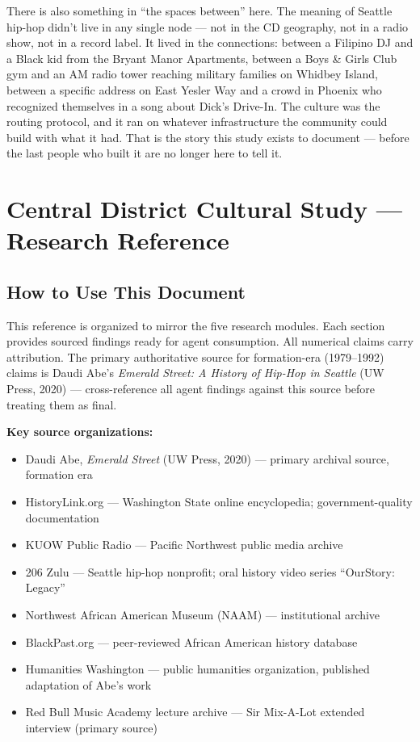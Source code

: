 \documentclass[11pt,letterpaper]{article}
\newcommand{\stageheader}[2]{%
  \noindent\colorbox{#2}{\makebox[\textwidth][l]{%
    \textcolor{white}{\bfseries\sffamily\hspace{6pt}#1\hspace{6pt}}}}%
  \vspace{0.5em}\par%
}
\begin{document}
There is also something in ``the spaces between'' here. The meaning of Seattle hip-hop didn't live in any single node --- not in the CD geography, not in a radio show, not in a record label. It lived in the connections: between a Filipino DJ and a Black kid from the Bryant Manor Apartments, between a Boys \& Girls Club gym and an AM radio tower reaching military families on Whidbey Island, between a specific address on East Yesler Way and a crowd in Phoenix who recognized themselves in a song about Dick's Drive-In. The culture was the routing protocol, and it ran on whatever infrastructure the community could build with what it had. That is the story this study exists to document --- before the last people who built it are no longer here to tell it.

\newpage

\stageheader{STAGE 2 --- RESEARCH REFERENCE}{secondary}

\section{Central District Cultural Study --- Research Reference}

\subsection{How to Use This Document}

This reference is organized to mirror the five research modules. Each section provides sourced findings ready for agent consumption. All numerical claims carry attribution. The primary authoritative source for formation-era (1979--1992) claims is Daudi Abe's \textit{Emerald Street: A History of Hip-Hop in Seattle} (UW Press, 2020) --- cross-reference all agent findings against this source before treating them as final.

\textbf{Key source organizations:}
\begin{itemize}
  \item Daudi Abe, \textit{Emerald Street} (UW Press, 2020) --- primary archival source, formation era
  \item HistoryLink.org --- Washington State online encyclopedia; government-quality documentation
  \item KUOW Public Radio --- Pacific Northwest public media archive
  \item 206 Zulu --- Seattle hip-hop nonprofit; oral history video series ``OurStory: Legacy''
  \item Northwest African American Museum (NAAM) --- institutional archive
  \item BlackPast.org --- peer-reviewed African American history database
  \item Humanities Washington --- public humanities organization, published adaptation of Abe's work
  \item Red Bull Music Academy lecture archive --- Sir Mix-A-Lot extended interview (primary source)
\end{itemize}
\end{document}
